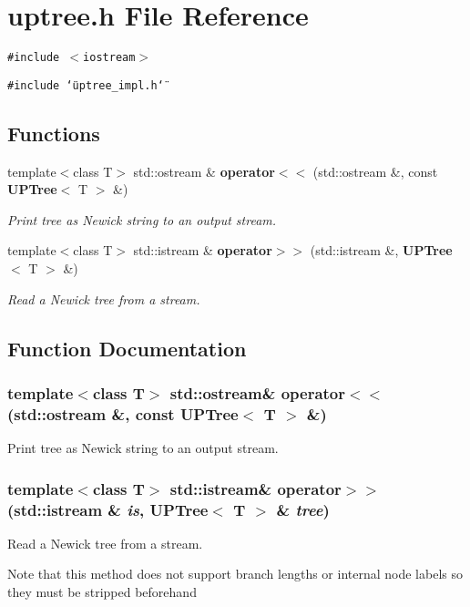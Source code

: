 \section{uptree.h File Reference}
\label{uptree_8h}
{\tt \#include $<$iostream$>$}\par
{\tt \#include \char`\"{}uptree\_\-impl.h\char`\"{}}\par
\subsection*{Functions}
\begin{CompactItemize}
\item 
template$<$class T$>$ std::ostream \& {\bf operator$<$$<$} (std::ostream \&, const {\bf UPTree}$<$ T $>$ \&)
\begin{CompactList}\small\item\em Print tree as Newick string to an output stream. \item\end{CompactList}\item 
template$<$class T$>$ std::istream \& {\bf operator$>$$>$} (std::istream \&, {\bf UPTree}$<$ T $>$ \&)
\begin{CompactList}\small\item\em Read a Newick tree from a stream. \item\end{CompactList}\end{CompactItemize}


\subsection{Function Documentation}
\subsubsection{\setlength{\rightskip}{0pt plus 5cm}template$<$class T$>$ std::ostream\& operator$<$$<$ (std::ostream \&, const {\bf UPTree}$<$ T $>$ \&)}\label{uptree_8h_a0}


Print tree as Newick string to an output stream. 

\subsubsection{\setlength{\rightskip}{0pt plus 5cm}template$<$class T$>$ std::istream\& operator$>$$>$ (std::istream \& {\em is}, {\bf UPTree}$<$ T $>$ \& {\em tree})}\label{uptree_8h_a1}


Read a Newick tree from a stream. 

Note that this method does not support branch lengths or internal node labels so they must be stripped beforehand 